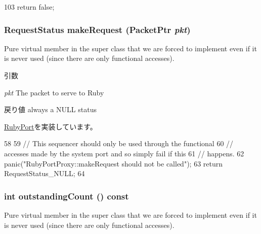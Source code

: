 \begin{DoxyCode}
103 { return false; }
\end{DoxyCode}
\hypertarget{classRubyPortProxy_a23de6e3fbb2362f4410d435e3600d0f7}{
\subsubsection[{makeRequest}]{\setlength{\rightskip}{0pt plus 5cm}RequestStatus makeRequest ({\bf PacketPtr} {\em pkt})}}
\label{classRubyPortProxy_a23de6e3fbb2362f4410d435e3600d0f7}
Pure virtual member in the super class that we are forced to implement even if it is never used (since there are only functional accesses).


\begin{DoxyParams}{引数}
\item[{\em pkt}]The packet to serve to Ruby \end{DoxyParams}
\begin{DoxyReturn}{戻り値}
always a NULL status 
\end{DoxyReturn}


\hyperlink{classRubyPort_a596adbddbc1059f06e3989f743f2ed3e}{RubyPort}を実装しています。


\begin{DoxyCode}
58 {
59     // This sequencer should only be used through the functional
60     // accesses made by the system port and so simply fail if this
61     // happens.
62     panic("RubyPortProxy::makeRequest should not be called");
63     return RequestStatus_NULL;
64 }
\end{DoxyCode}
\hypertarget{classRubyPortProxy_ae47593dc86baa86bf047ad1fbcdcceed}{
\subsubsection[{outstandingCount}]{\setlength{\rightskip}{0pt plus 5cm}int outstandingCount () const}}
\label{classRubyPortProxy_ae47593dc86baa86bf047ad1fbcdcceed}
Pure virtual member in the super class that we are forced to implement even if it is never used (since there are only functional accesses).

